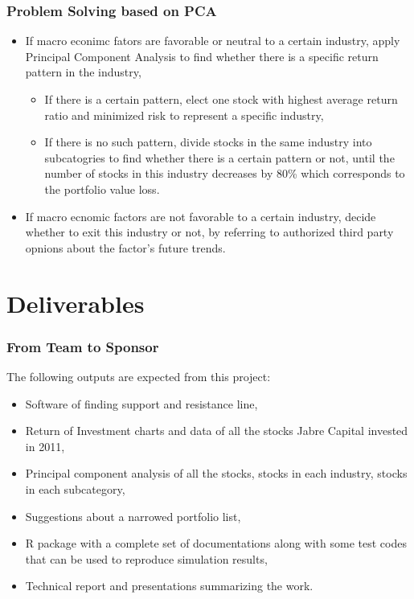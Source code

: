 \documentclass[compress,handout,10pt]{beamer}
\let\olditem\item
\renewcommand{\item}{\setlength{\itemsep}{0.5\baselineskip}\olditem}
\begin{document}
\begin{frame}
    \frametitle{Problem Solving based on PCA}
\begin{itemize}
\item If macro econimc fators are favorable or neutral to a certain industry, apply Principal Component Analysis to find whether there is a specific return pattern in the industry,
	\begin{itemize}
	\item If there is a certain pattern, elect one stock with highest average return ratio and minimized risk to represent a specific industry,
	\item If there is no such pattern, divide stocks in the same industry into subcatogries to find whether there is a certain pattern or not, until the number of stocks in this industry decreases by 80\% which corresponds to the portfolio value loss.
	\end{itemize}
\item If macro ecnomic factors are not favorable to a certain industry, decide whether to exit this industry or not, by referring to authorized third party opnions about the factor's future trends.
\end{itemize} 

\end{frame}

\section{Deliverables}
\begin{frame}
    \frametitle{From Team to Sponsor}
The following outputs are expected from this project:
\begin{itemize}
    \item Software of finding support and resistance line,
    \item Return of Investment charts and data of all the stocks Jabre Capital invested in 2011,
    \item Principal component analysis of all the stocks, stocks in each industry, stocks in each subcategory,
    \item Suggestions about a narrowed portfolio list,
    \item R package with a complete set of documentations along with some test codes that can be used to reproduce simulation results,
    \item Technical report and presentations summarizing the work. 
\end{itemize}

\end{frame}
\end{document}
